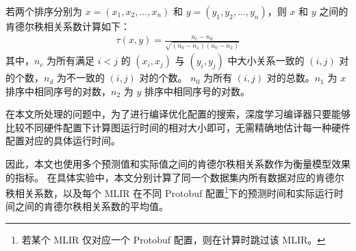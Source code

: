 若两个排序分别为 $x = (x_1,x_2, ..., x_n)$ 和 $y = (y_1,y_2, ..., y_n)$，则 $x$ 和 $y$ 之间的肯德尔秩相关系数计算如下：
\begin{align}
    \tau(x,y) = \frac{n_c-n_d}{\sqrt{(n_0-n_1)(n_0-n_2)}}
\end{align}
其中，$n_c$ 为所有满足 $i < j$ 的 $(x_i, x_j)$ 与 $(y_i,y_j)$ 中大小关系一致的 $(i,j)$ 对的个数，$n_d$ 为不一致的 $(i,j)$ 对的个数。
$n_0$ 为所有 $(i,j)$ 对的总数。$n_1$ 为 $x$ 排序中相同序号的对数，$n_2$ 为 $y$ 排序中相同序号的对数。

在本文所处理的问题中，为了进行编译优化配置的搜索，深度学习编译器只要能够比较不同硬件配置下计算图运行时间的相对大小即可，无需精确地估计每一种硬件配置对应的具体运行时间。

因此，本文也使用多个预测值和实际值之间的肯德尔秩相关系数作为衡量模型效果的指标。
在具体实验中，本文分别计算了同一个数据集内所有数据对应的肯德尔秩相关系数，以及每个 MLIR 在不同 Protobuf 配置\footnote{若某个 MLIR 仅对应一个 Protobuf 配置，则在计算时跳过该 MLIR。}下的预测时间和实际运行时间之间的肯德尔秩相关系数的平均值。
